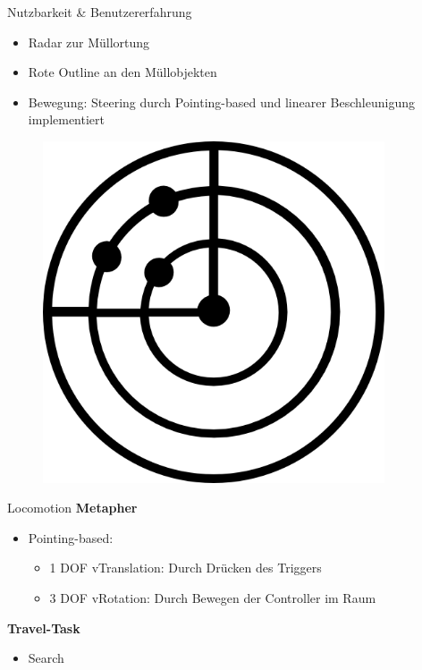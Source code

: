 \documentclass{beamer}
\begin{document}
\begin{frame}{Nutzbarkeit \& Benutzererfahrung}
\begin{minipage}[c]{0.72\textwidth}
\begin{itemize}
\item Radar zur Müllortung
\item Rote Outline an den Müllobjekten
\item Bewegung: Steering durch Pointing-based und linearer Beschleunigung implementiert
\end{itemize}
\end{minipage}
\hfill
\begin{minipage}[c]{0.25\textwidth}
\begin{figure}
\centering
\includegraphics[width=0.9\textwidth, keepaspectratio]{img/radar}
\caption{\cite{d}}
\end{figure}
\end{minipage}
\end{frame}

\begin{frame}{Locomotion}
\textbf{Metapher}
\begin{itemize}
\item Pointing-based:\begin{itemize}
\item 1 DOF vTranslation: Durch Drücken des Triggers
\item 3 DOF vRotation: Durch Bewegen der Controller im Raum
\end{itemize}
\end{itemize}
\textbf{Travel-Task}
\begin{itemize}
\item Search
\end{itemize}
\end{frame}
\end{document}
